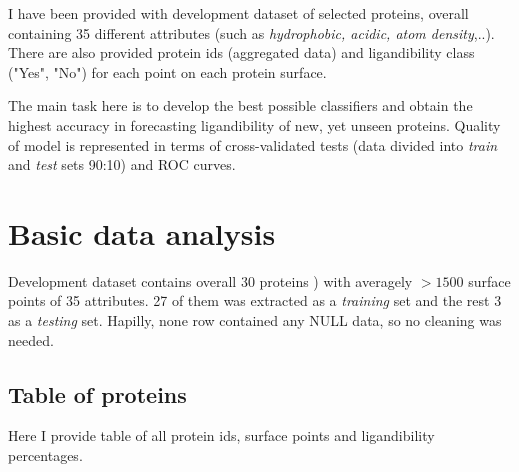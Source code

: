\documentclass[%
 aip,
 jmp,%
 amsmath,amssymb,
 reprint,%
]{revtex4-1}
\begin{document}
I have been provided with development dataset of selected proteins, overall containing 35 different attributes (such as \textit{hydrophobic, acidic, atom density},..). There are also provided protein ids (aggregated data) and ligandibility class ("Yes", "No") for each point on each protein surface.

The main task here is to develop the best possible classifiers and obtain the highest accuracy in forecasting ligandibility of new, yet unseen proteins. Quality of model is represented in terms of cross-validated tests (data divided into \textit{train} and \textit{test} sets 90:10) and ROC curves.

\section{Basic data analysis}

Development dataset contains overall 30 proteins ) with averagely $>1500$ surface points of 35 attributes. 27 of them was extracted as a \textit{training} set and the rest 3 as a \textit{testing} set. Hapilly, none row contained any NULL data, so no cleaning was needed.

\subsection{Table of proteins}
Here I provide table of all protein ids, surface points and ligandibility percentages.
\end{document}
